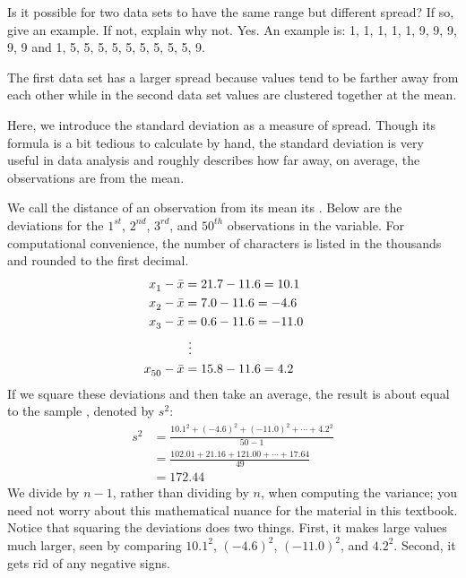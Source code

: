 \begin{examplewrap}
\begin{nexample}{Is it possible for two data sets to have the same range but different spread? If so, give an example. If not, explain why not.}
Yes. An example is:  {1, 1, 1, 1, 1, 9, 9, 9, 9, 9} and {1, 5, 5, 5, 5, 5, 5, 5, 5, 5, 9}.

The first data set has a larger spread because values tend to be farther away from each other while in the second data set values are clustered together at the mean.
\end{nexample}
\end{examplewrap}

Here, we introduce the standard deviation as a measure of spread. Though its formula is a bit tedious to calculate by hand, the standard deviation is very useful in data analysis and roughly describes how far away, on average, the observations are from the mean.

We call the distance of an observation from its mean its . Below are the deviations for the $1^{st}_{}$, $2^{nd}_{}$, $3^{rd}$, and $50^{th}_{}$ observations in the  variable. For computational convenience, the number of characters is listed in the thousands and rounded to the first decimal.
\begin{align*}
x_1^{}-\bar{x} &= 21.7 - 11.6 = 10.1 \hspace{5mm}\text{ } \\
x_2^{}-\bar{x} &= 7.0 - 11.6 = -4.6 \\
x_3^{}-\bar{x} &= 0.6 - 11.6 = -11.0 \\
			&\ \vdots \\
x_{50}^{}-\bar{x} &= 15.8 - 11.6 = 4.2
\end{align*}
If we square these deviations and then take an average, the result is about equal to the sample \label{varianceIsDefined}, denoted by $s_{}^2$:
\begin{align*}
s_{}^2 &= \frac{10.1_{}^2 + (-4.6)_{}^2 + (-11.0)_{}^2 + \cdots + 4.2_{}^2}{50-1} \\
	&= \frac{102.01 + 21.16 + 121.00 + \cdots + 17.64}{49} \\
	&= 172.44
\end{align*}
We divide by $n-1$, rather than dividing by $n$, when computing the variance; you need not worry about this mathematical nuance for the material in this textbook. Notice that squaring the deviations does two things. First, it makes large values much larger, seen by comparing $10.1^2$, $(-4.6)^2$, $(-11.0)^2$, and $4.2^2$. Second, it gets rid of any negative signs.

